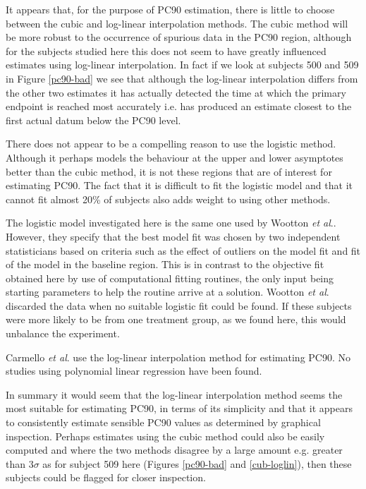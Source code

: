 It appears that, for the purpose of PC90 estimation, there is little to choose between the cubic and log-linear interpolation methods. The cubic method will be more robust to the occurrence of spurious data in the PC90 region, although for the subjects studied here this does not seem to have greatly influenced estimates using log-linear interpolation. In fact if we look at subjects 500 and 509 in Figure \ref{pc90-bad} we see that although the log-linear interpolation differs from the other two estimates it has actually detected the time at which the primary endpoint is reached most accurately i.e. has produced an estimate closest to the first actual datum below the PC90 level.

There does not appear to be a compelling reason to use the logistic method. Although it perhaps models the behaviour at the upper and lower asymptotes better than the cubic method, it is not these regions that are of interest for estimating PC90. The fact that it is difficult to fit the logistic model and that it cannot fit almost 20\% of subjects also adds weight to using other methods.

The logistic model investigated here is the same one used by Wootton \textit{et al}.\cite{wootton}. However, they specify that the best model fit was chosen by two independent statisticians based on criteria such as the effect of outliers on the model fit and fit of the model in the baseline region. This is in contrast to the objective fit obtained here by use of computational fitting routines, the only input being starting parameters to help the routine arrive at a solution. Wootton \textit{et al}. discarded the data when no suitable logistic fit could be found. If these subjects were more likely to be from one treatment group, as we found here, this would unbalance the experiment.

Carmello \textit{et al}.\cite{carmello} use the log-linear interpolation method for estimating PC90. No studies using polynomial linear regression have been found.

In summary it would seem that the log-linear interpolation method seems the most suitable for estimating PC90, in terms of its simplicity and that it appears to consistently estimate sensible PC90 values as determined by graphical inspection. Perhaps estimates using the cubic method could also be easily computed and where the two methods disagree by a large amount e.g. greater than $3\sigma$ as for subject 509 here (Figures \ref{pc90-bad} and \ref{cub-loglin}), then these subjects could be flagged for closer inspection.

